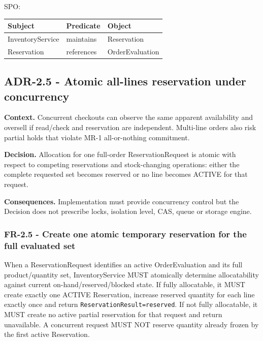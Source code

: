 \documentclass[
  10pt,
]{article}
\begin{document}
SPO:

\begin{longtable}[]{@{}lll@{}}
\toprule\noalign{}
Subject & Predicate & Object \\
\midrule\noalign{}
\endhead
\bottomrule\noalign{}
\endlastfoot
InventoryService & maintains & Reservation \\
Reservation & references & OrderEvaluation \\
\end{longtable}

\subsection{ADR-2.5 - Atomic all-lines reservation under
concurrency}\label{adr-25---atomic-all-lines-reservation-under-concurrency}

\textbf{Context.} Concurrent checkouts can observe the same apparent
availability and oversell if read/check and reservation are independent.
Multi-line orders also risk partial holds that violate MR-1
all-or-nothing commitment.

\textbf{Decision.} Allocation for one full-order ReservationRequest is
atomic with respect to competing reservations and stock-changing
operations: either the complete requested set becomes reserved or no
line becomes ACTIVE for that request.

\textbf{Consequences.} Implementation must provide concurrency control
but the Decision does not prescribe locks, isolation level, CAS, queue
or storage engine.

\subsubsection{FR-2.5 - Create one atomic temporary reservation for the
full evaluated
set}\label{fr-25---create-one-atomic-temporary-reservation-for-the-full-evaluated-set}

When a ReservationRequest identifies an active OrderEvaluation and its
full product/quantity set, InventoryService MUST atomically determine
allocatability against current on-hand/reserved/blocked state. If fully
allocatable, it MUST create exactly one ACTIVE Reservation, increase
reserved quantity for each line exactly once and return
\texttt{ReservationResult=reserved}. If not fully allocatable, it MUST
create no active partial reservation for that request and return
unavailable. A concurrent request MUST NOT reserve quantity already
frozen by the first active Reservation.
\end{document}

